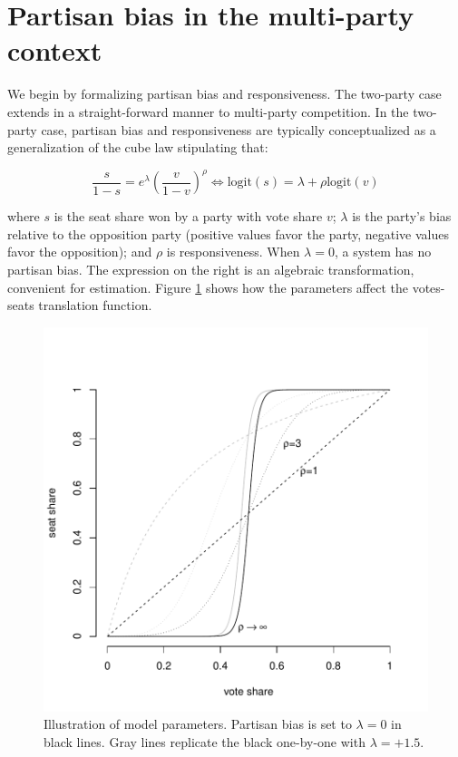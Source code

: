 \documentclass[letter,12pt]{article}
\begin{document}
\section{Partisan bias in the multi-party context}\label{S:bias}

We begin by formalizing partisan bias and responsiveness. The two-party case \citep{taagepera.CubeLaw.1973,tufte1973seatsVotes,king.browning1987biasRespUS} extends in a straight-forward manner to multi-party competition. In the two-party case, partisan bias and responsiveness are typically conceptualized as a generalization of the cube law stipulating that:

\begin{equation}\label{E:kingBi}
 \frac{s}{1-s} = e^\lambda  \left(\frac{v}{1-v}\right)^\rho \iff
 \text{logit}(s) = \lambda + \rho  \text{logit}(v)
\end{equation}\label{E:cubeLaw}

\noindent where $s$ is the seat share won by a party with vote share $v$; $\lambda$ is the party's bias relative to the opposition party (positive values favor the party, negative values favor the opposition); and $\rho$ is responsiveness. When $\lambda=0$, a system has no partisan bias. The expression on the right is an algebraic transformation, convenient for estimation. Figure \ref{F:lambdaRhoEx} shows how the parameters affect the votes-seats translation function. 


\begin{figure}
\begin{center}
    \includegraphics[width=.55\columnwidth]{rhoExample.pdf} 
\caption{Illustration of model parameters. Partisan bias is set to $\lambda=0$ in black lines. Gray lines replicate the black one-by-one with $\lambda=+1.5$.}\label{F:lambdaRhoEx}
\end{center}
\end{figure}
\end{document}
